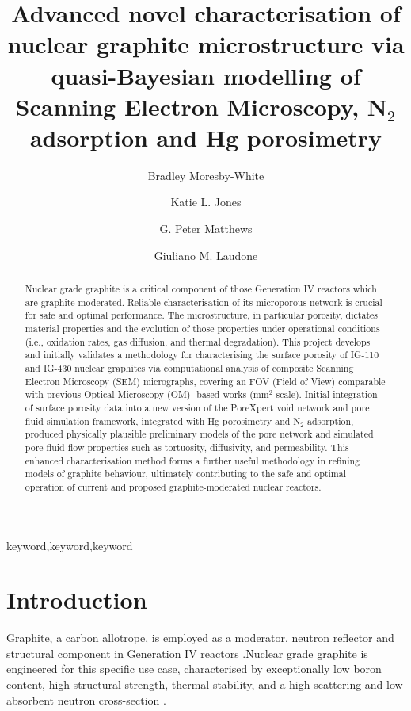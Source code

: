 \documentclass[review]{elsarticle}
\begin{document}
\begin{frontmatter}
\title{Advanced novel characterisation of nuclear graphite microstructure via quasi-Bayesian modelling of Scanning Electron Microscopy, N$_2$ adsorption and Hg porosimetry}
\author[plym]{Bradley Moresby-White}
\author[plym]{Katie L. Jones}
\author[plym]{G. Peter Matthews}
\author[plym]{Giuliano M. Laudone}
\address[plym]{Faculty of Science and Engineering, University of Plymouth, Plymouth, UK}
\begin{abstract}
Nuclear grade graphite is a critical component of those Generation IV reactors
which are graphite-moderated. Reliable characterisation of its microporous
network is crucial for safe and optimal performance. The microstructure, in
particular porosity, dictates material properties and the evolution of those
properties under operational conditions (i.e., oxidation rates, gas diffusion,
and thermal degradation). This project develops and initially validates a
methodology for characterising the surface porosity of IG-110 and IG-430 nuclear
graphites via computational analysis of composite Scanning Electron Microscopy
(SEM) micrographs, covering an FOV (Field of View) comparable with previous
Optical Microscopy (OM) -based works (mm\(^2\) scale). Initial integration of
surface porosity data into a new version of the PoreXpert void network and pore
fluid simulation framework, integrated with Hg porosimetry and N$_2$ adsorption,
produced physically plausible preliminary models of the pore network and
simulated pore-fluid flow properties such as tortuosity, diffusivity, and
permeability. This enhanced characterisation method forms a further useful
methodology in refining models of graphite behaviour, ultimately contributing to
the safe and optimal operation of current and proposed graphite-moderated
nuclear reactors.
\end{abstract}
\begin{keyword}keyword\sep keyword\sep keyword\end{keyword}
\end{frontmatter}
\section{Introduction}
Graphite, a carbon allotrope, is employed as a moderator, neutron reflector and
structural component in Generation IV reactors \citep{MARSDENgeniv}.Nuclear
grade graphite is engineered for this specific use case, characterised by
exceptionally low boron content, high structural strength, thermal stability,
and a high scattering and low absorbent neutron cross-section
\citep{Marsden2016}.
\end{document}
